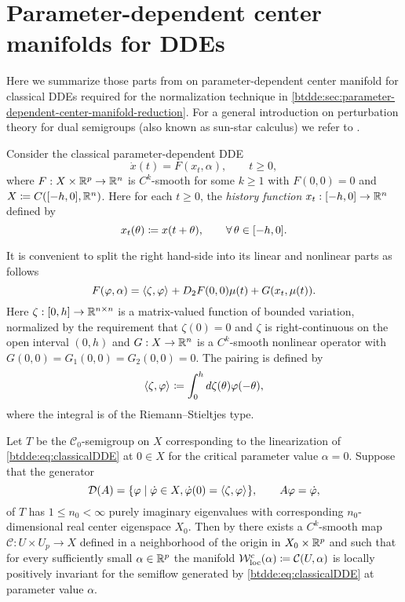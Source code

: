 \section{Parameter-dependent center manifolds for DDEs}
\label{btdde:sec:sunstar}

Here we summarize those parts from \cite{Switching2019} on parameter-dependent
center manifold for classical DDEs required for the normalization technique in
\cref{btdde:sec:parameter-dependent-center-manifold-reduction}. For a general
introduction on perturbation theory for dual semigroups (also known as sun-star
calculus) we refer to \cite{diekmann1995delay}.

Consider the classical parameter-dependent DDE
\begin{equation}
    \tag{DDE}
    \label{btdde:eq:classicalDDE}
    \dot{x}(t)= F(x_t, \alpha), \qquad t \ge 0,
\end{equation}
where $F: X \times \mathbb{R}^p \to \mathbb{R}^n$ is $C^k$-smooth for some $k \ge 1$ with
$F(0,0) = 0$ and $X \coloneqq C([-h,0],\mathbb{R}^n)$. Here for each $t \ge 0$, the
\emph{history function} $x_t : [-h,0] \to \mathbb{R}^n$ defined by
\[
  x_t(\theta) \coloneqq x(t + \theta), \qquad \forall\,\theta \in [-h,0].
\]

It is convenient to split the right hand-side into its linear and nonlinear
parts as follows
\begin{equation}
  \label{btdde:eq:classicalDDE12}
      F(\varphi,\alpha)= \langle \zeta,\varphi \rangle_{} + D_2F(0,0)\mu(t) + G(x_t, \mu(t)).
\end{equation}
Here $\zeta : [0,h] \to \mathbb{R}^{n \times n}$ is a matrix-valued function of
bounded variation, normalized by the requirement that $\zeta(0) = 0$ and
$\zeta$ is right-continuous on the open interval $(0,h)$ and $G : X \to \mathbb{R}^n$
is a $C^k$-smooth nonlinear operator with $G(0,0) = G_1(0,0) = G_2(0,0) = 0$.
The pairing is defined by
%
\begin{equation}
  \label{btdde:eq:lindde_shorthand}
  \langle \zeta,\varphi \rangle_{} \coloneqq \int_0^h{d\zeta(\theta)\varphi(-\theta}),
\end{equation}
where the integral is of the Riemann--Stieltjes type.

Let $T$ be the $\mathcal{C}_0$-semigroup on $X$ corresponding to the
linearization of \cref{btdde:eq:classicalDDE} at $0 \in X$ for the critical parameter
value $\alpha = 0$. Suppose that the generator 
\[
    \mathcal{D}{(A)}  = \{ \varphi \mid \dot {\varphi} \in X, \dot {\varphi}(0) = \langle \zeta,\varphi \rangle_{}\}, 
    \qquad 
    A\varphi = \dot {\varphi},
\]
of $T$ has $1 \le n_0 < \infty$ purely imaginary eigenvalues with corresponding
$n_0$-dimensional real center eigenspace $X_0$. Then by \cite[Corollary
20]{Switching2019} there exists a $C^k$-smooth map $\mathcal{C} : U \times U_p
\to X$ defined in a neighborhood of the origin in $X_0 \times \mathbb{R}^p$ and such
that for every sufficiently small $\alpha \in \mathbb{R}^p$ the manifold $\mathcal{W}^c_{\text{loc}}(\alpha)
\coloneqq \mathcal{C}(U,\alpha)$ is locally positively invariant for the semiflow
generated by \cref{btdde:eq:classicalDDE} at parameter value $\alpha$.

